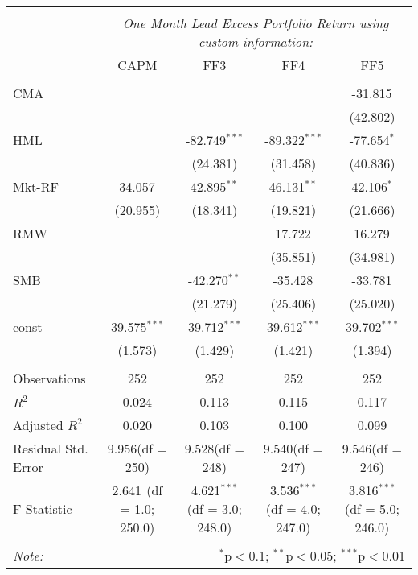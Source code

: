 \begin{table}[!htbp] \centering
\begin{tabular}{@{\extracolsep{5pt}}lcccc}
\\[-1.8ex]\hline
\hline \\[-1.8ex]
& \multicolumn{4}{c}{\textit{One Month Lead Excess Portfolio Return using custom information:}} \
\cr \cline{4-5}
\\[-1.8ex] & CAPM & FF3 & FF4 & FF5 \\
\hline \\[-1.8ex]
 CMA & & & & -31.815$^{}$ \\
  & & & & (42.802) \\
 HML & & -82.749$^{***}$ & -89.322$^{***}$ & -77.654$^{*}$ \\
  & & (24.381) & (31.458) & (40.836) \\
 Mkt-RF & 34.057$^{}$ & 42.895$^{**}$ & 46.131$^{**}$ & 42.106$^{*}$ \\
  & (20.955) & (18.341) & (19.821) & (21.666) \\
 RMW & & & 17.722$^{}$ & 16.279$^{}$ \\
  & & & (35.851) & (34.981) \\
 SMB & & -42.270$^{**}$ & -35.428$^{}$ & -33.781$^{}$ \\
  & & (21.279) & (25.406) & (25.020) \\
 const & 39.575$^{***}$ & 39.712$^{***}$ & 39.612$^{***}$ & 39.702$^{***}$ \\
  & (1.573) & (1.429) & (1.421) & (1.394) \\
\hline \\[-1.8ex]
 Observations & 252 & 252 & 252 & 252 \\
 $R^2$ & 0.024 & 0.113 & 0.115 & 0.117 \\
 Adjusted $R^2$ & 0.020 & 0.103 & 0.100 & 0.099 \\
 Residual Std. Error & 9.956(df = 250) & 9.528(df = 248) & 9.540(df = 247) & 9.546(df = 246)  \\
 F Statistic & 2.641$^{}$ (df = 1.0; 250.0) & 4.621$^{***}$ (df = 3.0; 248.0) & 3.536$^{***}$ (df = 4.0; 247.0) & 3.816$^{***}$ (df = 5.0; 246.0) \\
\hline
\hline \\[-1.8ex]
\textit{Note:} & \multicolumn{4}{r}{$^{*}$p$<$0.1; $^{**}$p$<$0.05; $^{***}$p$<$0.01} \\
\end{tabular}
\end{table}
